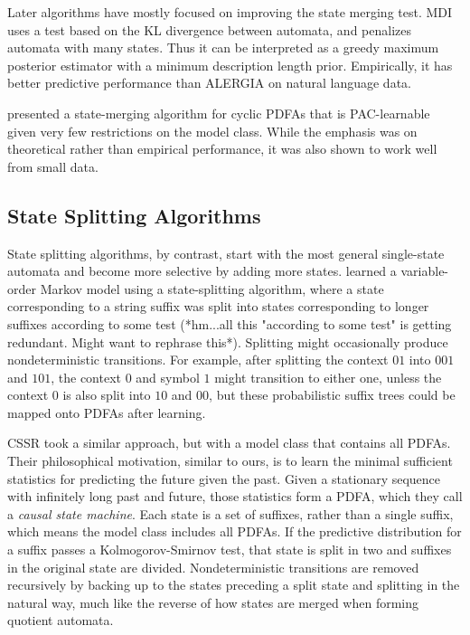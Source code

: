 \documentclass[11pt]{article}
\begin{document}
Later algorithms have mostly focused on improving the state merging test.  MDI uses a test based on the KL divergence between automata, and penalizes automata with many states.  Thus it can be interpreted as a greedy maximum posterior estimator with a minimum description length prior.  Empirically, it has better predictive performance than ALERGIA on natural language data.

\cite{Clark2004} presented a state-merging algorithm for cyclic PDFAs that is PAC-learnable given very few restrictions on the model class.  While the emphasis was on theoretical rather than empirical performance, it was also shown to work well from small data.

\subsection{State Splitting Algorithms}

State splitting algorithms, by contrast, start with the most general single-state automata and become more selective by adding more states.  \cite{Ron1995} learned a variable-order Markov model using a state-splitting algorithm, where a state corresponding to a string suffix was split into states corresponding to longer suffixes according to some test (*hm...all this "according to some test" is getting redundant.  Might want to rephrase this*).  Splitting might occasionally produce nondeterministic transitions.  For example, after splitting the context $01$ into $001$ and $101$, the context $0$ and symbol $1$ might transition to either one, unless the context $0$ is also split into $10$ and $00$, but these probabilistic suffix trees could be mapped onto PDFAs after learning.

CSSR \cite{Shalizi2004} took a similar approach, but with a model class that contains all PDFAs.  Their philosophical motivation, similar to ours, is to learn the minimal sufficient statistics for predicting the future given the past.  Given a stationary sequence with infinitely long past and future, those statistics form a PDFA, which they call a {\em causal state machine}.  Each state is a set of suffixes, rather than a single suffix, which means the model class includes all PDFAs.  If the predictive distribution for a suffix passes a Kolmogorov-Smirnov test, that state is split in two and suffixes in the original state are divided.  Nondeterministic transitions are removed recursively by backing up to the states preceding a split state and splitting in the natural way, much like the reverse of how states are merged when forming quotient automata.
\end{document}
